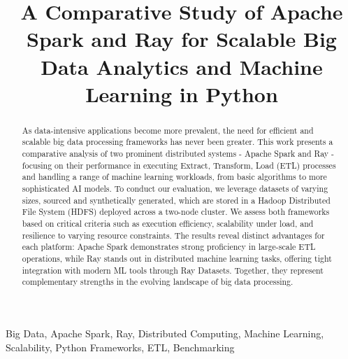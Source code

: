 \documentclass[conference]{IEEEtran}
\begin{document}
\title{A Comparative Study of Apache Spark and Ray for
Scalable Big Data Analytics and Machine Learning in Python}

\author{
    
  \and

}

\maketitle

\begin{abstract}
As data-intensive applications become more prevalent, the need for
efficient and scalable big data processing frameworks has never been greater.
This work presents a comparative analysis of two prominent distributed systems - Apache Spark and
Ray - focusing on their performance in executing Extract, Transform, Load (ETL) processes and
handling a range of machine learning workloads, from basic algorithms to more sophisticated
AI models. To conduct our evaluation, we leverage datasets of varying sizes, sourced and
synthetically generated, which are stored in a Hadoop Distributed File System (HDFS) deployed
across a two-node cluster. We assess both frameworks based on critical criteria such as
execution efficiency, scalability under load, and resilience to varying resource constraints.
The results reveal distinct advantages for each platform: Apache Spark demonstrates strong
proficiency in large-scale ETL operations, while Ray stands out in distributed machine
learning tasks, offering tight integration with modern ML tools through Ray Datasets.
Together, they represent complementary strengths in the evolving landscape of
big data processing.
\end{abstract}

\begin{IEEEkeywords}
Big Data, Apache Spark, Ray, Distributed Computing, Machine Learning, Scalability,
Python Frameworks, ETL, Benchmarking
\end{IEEEkeywords}
\end{document}
